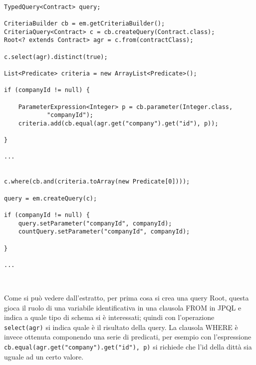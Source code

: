 \begin{lstlisting}

TypedQuery<Contract> query;

CriteriaBuilder cb = em.getCriteriaBuilder();
CriteriaQuery<Contract> c = cb.createQuery(Contract.class);
Root<? extends Contract> agr = c.from(contractClass);

c.select(agr).distinct(true);

List<Predicate> criteria = new ArrayList<Predicate>();

if (companyId != null) {

	ParameterExpression<Integer> p = cb.parameter(Integer.class,
			"companyId");
	criteria.add(cb.equal(agr.get("company").get("id"), p));

}

...


c.where(cb.and(criteria.toArray(new Predicate[0])));
	
query = em.createQuery(c);

if (companyId != null) {
	query.setParameter("companyId", companyId);
	countQuery.setParameter("companyId", companyId);

}

...	

 
\end{lstlisting}

Come si può vedere dall'estratto, per prima cosa si crea una query Root, questa gioca il ruolo di una variabile identificativa in una clausola FROM 
in JPQL e indica a quale tipo di schema si è interessati; quindi con l'operazione \lstinline{select(agr)} si indica quale è il
risultato della query. La clausola WHERE è invece ottenuta componendo una serie di predicati, per esempio con l'espressione
\lstinline{cb.equal(agr.get("company").get("id"), p)} si richiede che l'id della dittà sia uguale ad un certo valore.



